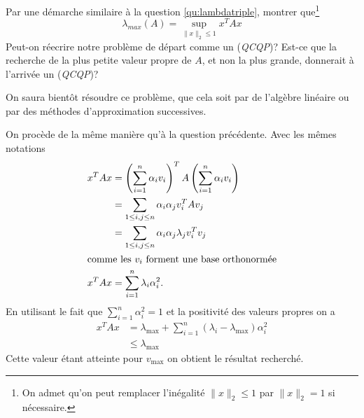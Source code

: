 \documentclass[11pt, a4paper]{article}
\begin{document}
\begin{question}
  Par une démarche similaire à la question \eqref{qu:lambdatriple},
  montrer que\footnote{On admet qu'on peut remplacer l'inégalité
    $\|x\|_2 \leq 1$ par $\|x\|_2 = 1$ si nécessaire.}
  \[
  \lambda_{max}(A) = \sup_{\|x\|_2 \leq 1}x^TAx
  \]
  Peut-on réecrire notre problème de départ comme un (\emph{QCQP})?
  Est-ce que la recherche de la plus petite valeur propre de $A$, et
  non la plus grande, donnerait à l'arrivée un (\emph{QCQP})?
\end{question}
On saura bientôt résoudre ce problème, que cela soit par de l'algèbre
linéaire ou par des méthodes d'approximation successives.
\begin{solution}
  On procède de la même manière qu'à la question précédente. Avec les
  mêmes notations
  \begin{align}
    x^TAx 
    & = 
    \left(\sum_{i=1}^n\alpha_iv_i\right)^TA\left(\sum_{i=1}^n\alpha_iv_i\right)\\ 
    & = \sum_{1 \leq i, j\leq n} \alpha_i\alpha_jv_i^TAv_j \\
    & = \sum_{1 \leq i, j\leq n} \alpha_i\alpha_j\lambda_jv_i^Tv_j\\
    \intertext{comme les $v_i$ forment une base orthonormée}
    x^TAx & = \sum_{i=1}^n \lambda_i\alpha_i^2. 
  \end{align}
  En utilisant le fait que $\sum_{i=1}^n \alpha_i^2 = 1$ et la
  positivité des valeurs propres on a
  \begin{align}
  x^TAx & = \lambda_{\text{max}} + \sum_{i=1}^n (\lambda_i - \lambda_{\text{max}})\alpha_i^2 \\
    & \leq \lambda_{\text{max}}
  \end{align}
  Cette valeur étant atteinte pour $v_{\text{max}}$ on obtient le
  résultat recherché. 


\end{solution}
\end{document}
